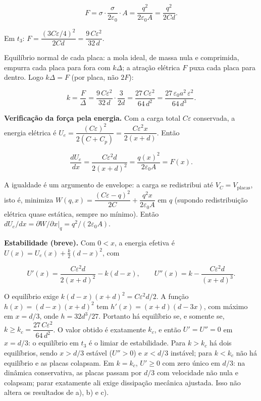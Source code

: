 \documentclass{article}%
\begin{document}
\[ F=\sigma\cdot\frac{\sigma}{2\varepsilon_0}\cdot A=\frac{q^2}{2\varepsilon_0A}=\frac{q^2}{2Cd}. \]

Em $t_3$: $F=\dfrac{(3C\varepsilon/4)^2}{2Cd}=\dfrac{9\,C\varepsilon^2}{32\,d}$.

Equilíbrio normal de cada placa: a mola ideal, de massa nula e comprimida, empurra cada placa para fora com $k\Delta$; a atração elétrica $F$ puxa cada placa para dentro. Logo $k\Delta=F$ (por placa, não $2F$):

\[ k=\frac{F}{\Delta}=\frac{9\,C\varepsilon^2}{32\,d}\cdot\frac{3}{2d}=\frac{27\,C\varepsilon^2}{64\,d^2}=\frac{27\,\varepsilon_0a^2\,\varepsilon^2}{64\,d^3}. \]

\textbf{Verificação da força pela energia.} Com a carga total $C\varepsilon$ conservada, a energia elétrica é $U_e=\dfrac{(C\varepsilon)^2}{2(C+C_p)}=\dfrac{C\varepsilon^2x}{2(x+d)}$. Então

\[ \frac{dU_e}{dx}=\frac{C\varepsilon^2d}{2(x+d)^2}=\frac{q(x)^2}{2\varepsilon_0A}=F(x). \]

A igualdade é um argumento de envelope: a carga se redistribui até $V_C=V_{\text{placas}}$, isto é, minimiza $W(q,x)=\dfrac{(C\varepsilon-q)^2}{2C}+\dfrac{q^2x}{2\varepsilon_0A}$ em $q$ (supondo redistribuição elétrica quase estática, sempre no mínimo). Então $dU_e/dx=\partial W/\partial x|_q=q^2/(2\varepsilon_0A)$.

\textbf{Estabilidade (breve).} Com $0<x$, a energia efetiva é $U(x)=U_e(x)+\frac{k}{2}(d-x)^2$, com

\[ U'(x)=\frac{C\varepsilon^2d}{2(x+d)^2}-k(d-x),\qquad U''(x)=k-\frac{C\varepsilon^2d}{(x+d)^3}. \]

O equilíbrio exige $k(d-x)(x+d)^2=C\varepsilon^2d/2$. A função $h(x)=(d-x)(x+d)^2$ tem $h'(x)=(x+d)(d-3x)$, com máximo em $x=d/3$, onde $h=32d^3/27$. Portanto há equilíbrio se, e somente se, $k\geq k_c=\dfrac{27\,C\varepsilon^2}{64\,d^2}$. O valor obtido é exatamente $k_c$, e então $U'=U''=0$ em $x=d/3$: o equilíbrio em $t_3$ é o limiar de estabilidade. Para $k>k_c$ há dois equilíbrios, sendo $x>d/3$ estável ($U''>0$) e $x<d/3$ instável; para $k<k_c$ não há equilíbrio e as placas colapsam. Em $k=k_c$, $U'\geq 0$ com zero único em $d/3$: na dinâmica conservativa, as placas passam por $d/3$ com velocidade não nula e colapsam; parar exatamente ali exige dissipação mecânica ajustada. Isso não altera os resultados de a), b) e c).
\end{document}
